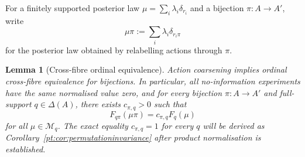 \documentclass[11pt,a4paper]{article}
\newtheorem{lemma}[theorem]{Lemma}
\theoremstyle{definition}
\newcommand{\1}{\mathbf 1}
\begin{document}
For a finitely supported posterior law $\mu=\sum_i\lambda_i\delta_{r_i}$ and a bijection $\pi:A\to A'$, write
\[
\mu\pi:=\sum_i\lambda_i\delta_{r_i\pi}
\]
for the posterior law obtained by relabelling actions through $\pi$.

\begin{lemma}[Cross-fibre ordinal equivalence]\label{pt:lem:actionbase}
Action coarsening implies ordinal cross-fibre equivalence for bijections.  In particular, all no-information
experiments have the same normalised value zero, and for every bijection $\pi:A\to A'$ and full-support
$q\in\Delta(A)$, there exists $c_{\pi,q}>0$ such that
\[
F_{q\pi}(\mu\pi)=c_{\pi,q} F_q(\mu)
\]
for all $\mu\in\mathcal M_q$.  The exact equality $c_{\pi,q}=1$ for every $q$ will be derived as
Corollary~\ref{pt:cor:permutationinvariance} after product normalisation is established.
\end{lemma}
\end{document}
